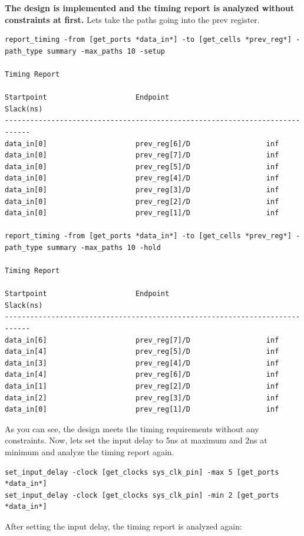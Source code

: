 \documentclass{report}
\begin{document}
\textbf{The design is implemented and the timing report is analyzed without constraints at first.}
Lets take the paths going into the prev register.
\begin{verbatim}
report_timing -from [get_ports *data_in*] -to [get_cells *prev_reg*] -path_type summary -max_paths 10 -setup

Timing Report

Startpoint                     Endpoint                       Slack(ns)     
----------------------------------------------------------------------------
data_in[0]                     prev_reg[6]/D                  inf           
data_in[0]                     prev_reg[7]/D                  inf           
data_in[0]                     prev_reg[5]/D                  inf           
data_in[0]                     prev_reg[4]/D                  inf           
data_in[0]                     prev_reg[3]/D                  inf           
data_in[0]                     prev_reg[2]/D                  inf           
data_in[0]                     prev_reg[1]/D                  inf       

report_timing -from [get_ports *data_in*] -to [get_cells *prev_reg*] -path_type summary -max_paths 10 -hold

Timing Report

Startpoint                     Endpoint                       Slack(ns)     
----------------------------------------------------------------------------
data_in[6]                     prev_reg[7]/D                  inf           
data_in[4]                     prev_reg[5]/D                  inf           
data_in[3]                     prev_reg[4]/D                  inf           
data_in[4]                     prev_reg[6]/D                  inf           
data_in[1]                     prev_reg[2]/D                  inf           
data_in[2]                     prev_reg[3]/D                  inf           
data_in[0]                     prev_reg[1]/D                  inf
\end{verbatim}
As you can see, the design meets the timing requirements without any constraints. Now, lets set the input delay to 5ns at maximum and 2ns at minimum and analyze the timing report again.
\begin{verbatim}
set_input_delay -clock [get_clocks sys_clk_pin] -max 5 [get_ports *data_in*]
set_input_delay -clock [get_clocks sys_clk_pin] -min 2 [get_ports *data_in*]
\end{verbatim}
After setting the input delay, the timing report is analyzed again:
\end{document}
